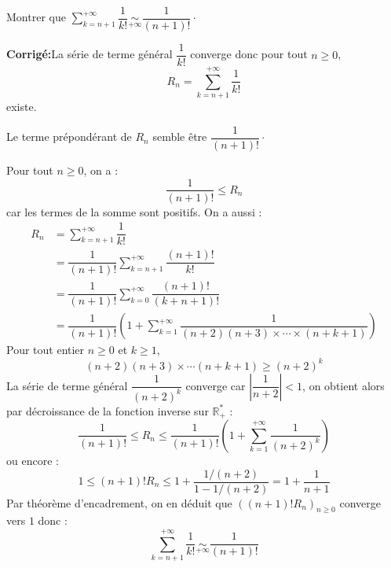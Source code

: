 \documentclass[a4paper,twoside,french,10pt]{VcCours}
\newcommand{\corr}{\textbf{Corrigé:}}
\newcommand{\Sum}[2]{\ensuremath{\textstyle{\sum\limits_{#1}^{#2}}}}
\begin{document}
\medskip


\begin{Exercice}{} Montrer que $\Sum{k=n+1}{+ \infty} \dfrac{1}{k!} \underset{ + \infty}{\sim} \dfrac{1}{(n+1)!} \cdot$ \end{Exercice}

\corr La série de terme général $\dfrac{1}{k!}$ converge donc pour tout $n \geq 0$,
$$ R_n = \sum_{k=n+1}^{+ \infty} \dfrac{1}{k!}$$
existe. 

\medskip

\noindent Le terme prépondérant de $R_n$ semble être $\dfrac{1}{(n+1)!}\cdot$

\medskip

\noindent Pour tout $n \geq 0$, on a :
$$ \dfrac{1}{(n+1)!} \leq R_n$$
car les termes de la somme sont positifs. On a aussi :
\begin{align*}
R_n & = \sum_{k=n+1}^{+ \infty} \dfrac{1}{k!} \\
& = \dfrac{1}{(n+1)!} \sum_{k=n+1}^{+ \infty} \dfrac{(n+1)!}{k!} \\
& = \dfrac{1}{(n+1)!} \sum_{k=0}^{+ \infty} \dfrac{(n+1)!}{(k+n+1)!} \\
& = \dfrac{1}{(n+1)!} \left(1 + \sum_{k=1}^{+ \infty} \dfrac{1}{(n+2)(n+3) \times \cdots \times (n+k+1)} \right)
\end{align*}
Pour tout entier $n \geq 0$ et $k \geq 1$,
$$ (n+2)(n+3) \times \cdots (n+k+1) \geq (n+2)^k$$
La série de terme général $\dfrac{1}{(n+2)^k}$ converge car $\left\vert \dfrac{1}{n+2} \right\vert<1$, on obtient alors par décroissance de la fonction inverse sur $\mathbb{R}_+^*$ :
$$ \dfrac{1}{(n+1)!} \leq R_n \leq \dfrac{1}{(n+1)!} \left(1+ \sum_{k=1}^{+ \infty} \dfrac{1}{(n+2)^k} \right)$$
ou encore :
$$ 1 \leq (n+1)! R_n \leq 1 + \dfrac{1/(n+2)}{1-1/(n+2)} = 1 + \dfrac{1}{n+1}$$
Par théorème d'encadrement, on en déduit que $((n+1)! R_n)_{n \geq 0}$ converge vers $1$ donc :
$$ \sum_{k=n+1}^{+ \infty} \dfrac{1}{k!} \underset{ + \infty}{\sim} \dfrac{1}{(n+1)!}$$
\end{document}

